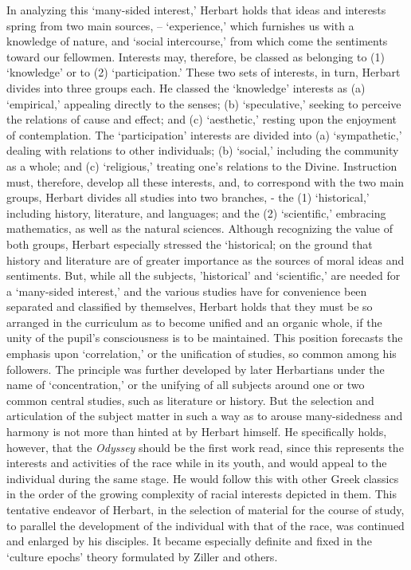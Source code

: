 \documentclass[
]{book}
\begin{document}
In analyzing this `many-sided interest,' Herbart holds that ideas and interests spring from two main sources, -- `experience,' which furnishes us with a knowledge of nature, and `social intercourse,' from which come the sentiments toward our fellowmen. Interests may, therefore, be classed as belonging to (1) `knowledge' or to (2) `participation.' These two sets of interests, in turn, Herbart divides into three groups each. He classed the `knowledge' interests as (a) `empirical,' appealing directly to the senses; (b) `speculative,' seeking to perceive the relations of cause and effect; and (c) `aesthetic,' resting upon the enjoyment of contemplation. The `participation' interests are divided into (a) `sympathetic,' dealing with relations to other individuals; (b) `social,' including the community as a whole; and (c) `religious,' treating one's relations to the Divine. Instruction must, therefore, develop all these interests, and, to correspond with the two main groups, Herbart divides all studies into two branches, - the (1) `historical,' including history, literature, and languages; and the (2) `scientific,' embracing mathematics, as well as the natural sciences. Although recognizing the value of both groups, Herbart especially stressed the `historical; on the ground that history and literature are of greater importance as the sources of moral ideas and sentiments. But, while all the subjects, 'historical' and `scientific,' are needed for a `many-sided interest,' and the various studies have for convenience been separated and classified by themselves, Herbart holds that they must be so arranged in the curriculum as to become unified and an organic whole, if the unity of the pupil's consciousness is to be maintained. This position forecasts the emphasis upon `correlation,' or the unification of studies, so common among his followers. The principle was further developed by later Herbartians under the name of `concentration,' or the unifying of all subjects around one or two common central studies, such as literature or history. But the selection and articulation of the subject matter in such a way as to arouse many-sidedness and harmony is not more than hinted at by Herbart himself. He specifically holds, however, that the \emph{Odyssey} should be the first work read, since this represents the interests and activities of the race while in its youth, and would appeal to the individual during the same stage. He would follow this with other Greek classics in the order of the growing complexity of racial interests depicted in them. This tentative endeavor of Herbart, in the selection of material for the course of study, to parallel the development of the individual with that of the race, was continued and enlarged by his disciples. It became especially definite and fixed in the `culture epochs' theory formulated by Ziller and others.
\end{document}
